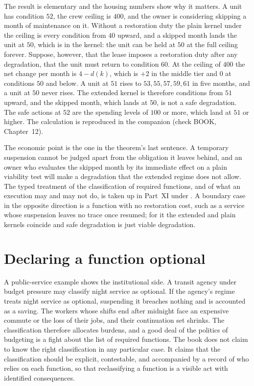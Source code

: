 The result is elementary and the housing numbers show why it matters. A unit has condition $52$, the crew ceiling is $400$, and the owner is considering skipping a month of maintenance on it. Without a restoration duty the plain kernel under the ceiling is every condition from $40$ upward, and a skipped month lands the unit at $50$, which is in the kernel: the unit can be held at $50$ at the full ceiling forever. Suppose, however, that the lease imposes a restoration duty after any degradation, that the unit must return to condition $60$. At the ceiling of $400$ the net change per month is $4-d(k)$, which is $+2$ in the middle tier and $0$ at conditions $50$ and below. A unit at $51$ rises to $53,55,57,59,61$ in five months, and a unit at $50$ never rises. The extended kernel is therefore conditions from $51$ upward, and the skipped month, which lands at $50$, is not a safe degradation. The safe actions at $52$ are the spending levels of $100$ or more, which land at $51$ or higher. The calculation is reproduced in the companion (check BOOK, Chapter~12).

The economic point is the one in the theorem's last sentence. A temporary suspension cannot be judged apart from the obligation it leaves behind, and an owner who evaluates the skipped month by its immediate effect on a plain viability test will make a degradation that the extended regime does not allow. The typed treatment of the classification of required functions, and of what an execution may and may not do, is taken up in Part~XI under . A boundary case in the opposite direction is a function with no restoration cost, such as a service whose suspension leaves no trace once resumed; for it the extended and plain kernels coincide and safe degradation is just viable degradation.

\section{Declaring a function optional}

A public-service example shows the institutional side. A transit agency under budget pressure may classify night service as optional. If the agency's regime treats night service as optional, suspending it breaches nothing and is accounted as a saving. The workers whose shifts end after midnight face an expensive commute or the loss of their jobs, and their continuation set shrinks. The classification therefore allocates burdens, and a good deal of the politics of budgeting is a fight about the list of required functions. The book does not claim to know the right classification in any particular case. It claims that the classification should be explicit, contestable, and accompanied by a record of who relies on each function, so that reclassifying a function is a visible act with identified consequences.

